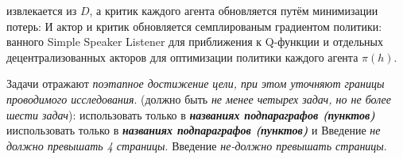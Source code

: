 извлекается из $D$, а критик каждого агента обновляется путём минимизации потерь:
И актор и критик обновляется семплированым градиентом политики:
ванного Simple Speaker Listener для приближения к Q-функции и отдельных децентрализованных акторов для оптимизации политики каждого агента $\pi (h)$. \cite{foerster2017counterfactual}

Задачи отражают \textit{поэтапное достижение цели, при этом уточняют границы проводимого исследования}.
 (должно быть \textit{не менее четырех задач, но не более шести задач}):
использовать только в \textbf{\textit{названиях подпараграфов (пунктов)}} ииспользовать только в \textbf{\textit{названиях подпараграфов (пунктов)}} и
Введение \textit{не должно превышать 4 страницы}.
Введение \textit{не-должно превышать страницы}.
